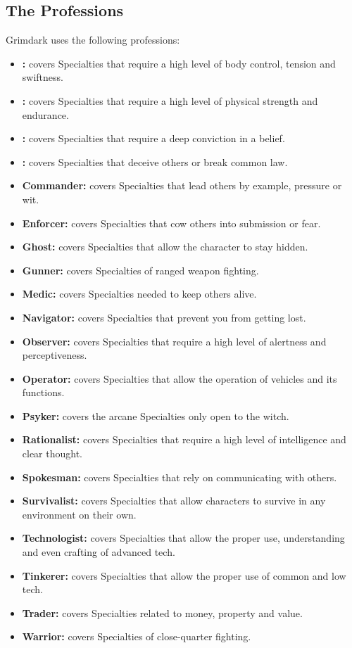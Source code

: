 \subsection{The Professions}
Grimdark uses the following professions:
\begin{itemize}
	\item \textbf{:} covers Specialties that require a high level of body control, tension and swiftness.
	\item \textbf{:} covers Specialties that require a high level of physical strength and endurance.
	\item \textbf{:} covers Specialties that require a deep conviction in a belief.
	\item \textbf{:} covers Specialties that deceive others or break common law.
	\item \textbf{Commander:} covers Specialties that lead others by example, pressure or wit.
	\item \textbf{Enforcer:} covers Specialties that cow others into submission or fear.
	\item \textbf{Ghost:} covers Specialties that allow the character to stay hidden.
	\item \textbf{Gunner:} covers Specialties of ranged weapon fighting.
	\item \textbf{Medic:} covers Specialties needed to keep others alive.
	\item \textbf{Navigator:} covers Specialties that prevent you from getting lost.
	\item \textbf{Observer:} covers Specialties that require a high level of alertness and perceptiveness.
	\item \textbf{Operator:} covers Specialties that allow the operation of vehicles and its functions.
	\item \textbf{Psyker:} covers the arcane Specialties only open to the witch.
	\item \textbf{Rationalist:} covers Specialties that require a high level of intelligence and clear thought.
	\item \textbf{Spokesman:} covers Specialties that rely on communicating with others.
	\item \textbf{Survivalist:} covers Specialties that allow characters to survive in any environment on their own.
	\item \textbf{Technologist:} covers Specialties that allow the proper use, understanding and even crafting of advanced tech.
	\item \textbf{Tinkerer:} covers Specialties that allow the proper use of common and low tech.
	\item \textbf{Trader:} covers Specialties related to money, property and value.
	\item \textbf{Warrior:} covers Specialties of close-quarter fighting.
\end{itemize}

